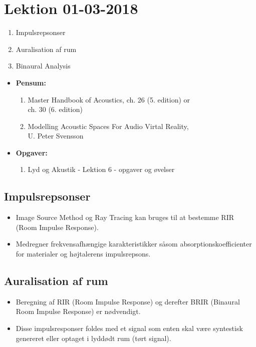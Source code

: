 \section{Lektion 01-03-2018}

\begin{enumerate}
	\item Impulsrepsonser
	\item Auralisation af rum
	\item Binaural Analysis
\end{enumerate}

\begin{mdframed}[style=exampledefault]
	\begin{itemize}
		\item \textbf{Pensum:} 
		\begin{enumerate}
			\item Master Handbook of Acoustics, ch. 26 (5. edition) or \\ch. 30 (6. edition)
			\item Modelling Acoustic Spaces For Audio Virtal Reality, \\U. Peter Svensson
		\end{enumerate}
		\item \textbf{Opgaver:} 
		\begin{enumerate}
			\item Lyd og Akustik - Lektion 6 - opgaver og øvelser
		\end{enumerate}
	\end{itemize}
\end{mdframed}

\subsection{Impulsrepsonser}
\begin{itemize}
	\item Image Source Method og Ray Tracing kan bruges til at bestemme RIR (Room Impulse Response).
	\item Medregner frekvensafhængige karakteristikker såsom absorptionskoefficienter for materialer og højtalerens impulsrepsons.
\end{itemize}
\newpage

\subsection{Auralisation af rum}
\begin{itemize}
	\item Beregning af RIR (Room Impulse Response) og derefter BRIR (Binaural Room Impulse Response) er nødvendigt.
	\item Disse impulsresponser foldes med et signal som enten skal være syntestisk genereret eller optaget i lyddødt rum (tørt signal). 
\end{itemize}


